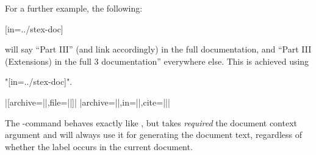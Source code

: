 For a further example, the following:
\begin{center}
    [in=../stex-doc]
\end{center}
will say ``Part III'' (and link accordingly) in the full documentation,
and ``Part III (Extensions) in the full \sTeX{}3 documentation''
everywhere else. This is achieved using

\stexcode"[in=../stex-doc]".

\begin{function}{\extref}
    \begin{syntax} |[archive=||,file=||]|%
        |{archive=||,in=||,cite=||}| \end{syntax}
    The -command behaves exactly like , but takes
    \emph{required} the document context argument and will always use it
    for generating the document text, regardless of whether the label
    occurs in the current document.
\end{function}


